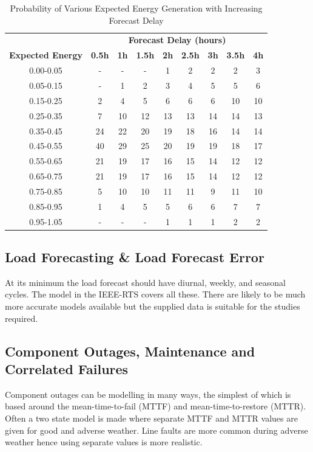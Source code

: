 \documentclass[a4paper,oneside,12pt]{report}
\begin{document}
\begin{table}[htbp]
\caption{Probability of Various Expected Energy Generation with Increasing Forecast Delay \cite{Bathurst2002}}
\label{table_forecast_error}
\centering
\begin{tabular}{c||c|c|c|c|c|c|c|c}
\bfseries  & \multicolumn{8}{c}{ \bfseries Forecast Delay (hours)} \\
\bfseries Expected Energy & \bfseries 0.5h & \bfseries 1h & \bfseries 1.5h & \bfseries 2h & \bfseries 2.5h & \bfseries 3h & \bfseries 3.5h & \bfseries 4h \\
\hline \hline
0.00-0.05 &  - &  - &  - &  1 &  2 &  2 &  2 &  3 \\
0.05-0.15 &  - &  1 &  2 &  3 &  4 &  5 &  5 &  6 \\
0.15-0.25 &  2 &  4 &  5 &  6 &  6 &  6 & 10 & 10 \\
0.25-0.35 &  7 & 10 & 12 & 13 & 13 & 14 & 14 & 13 \\
0.35-0.45 & 24 & 22 & 20 & 19 & 18 & 16 & 14 & 14 \\
0.45-0.55 & 40 & 29 & 25 & 20 & 19 & 19 & 18 & 17 \\
0.55-0.65 & 21 & 19 & 17 & 16 & 15 & 14 & 12 & 12 \\
0.65-0.75 & 21 & 19 & 17 & 16 & 15 & 14 & 12 & 12 \\
0.75-0.85 &  5 & 10 & 10 & 11 & 11 &  9 & 11 & 10 \\
0.85-0.95 &  1 &  4 &  5 &  5 &  6 &  6 &  7 &  7 \\
0.95-1.05 &  - &  - &  - &  1 &  1 &  1 &  2 &  2 \\
\hline
\end{tabular}
\end{table}


\subsection{Load Forecasting \& Load Forecast Error}

At its minimum the load forecast should have diurnal, weekly, and seasonal cycles. The model in the IEEE-RTS covers all these. There are likely to be much more accurate models available but the supplied data is suitable for the studies required.

\subsection{Component Outages, Maintenance and Correlated Failures}

Component outages can be modelling in many ways, the simplest of which is based around the mean-time-to-fail (MTTF) and mean-time-to-restore (MTTR). Often a two state model is made where separate MTTF and MTTR values are given for good and adverse weather. Line faults are more common during adverse weather hence using separate values is more realistic.
\end{document}
